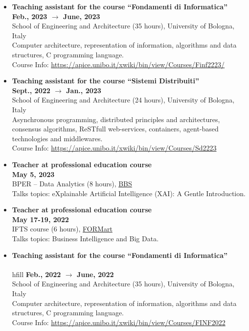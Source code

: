 \documentclass[11pt]{article}
\begin{document}
\begin{itemize}
	\item \textbf{ Teaching assistant for the course ``Fondamenti di Informatica'' }
	\\\hfill \textbf{Feb., 2023 $\rightarrow$ June, 2023}
	\\School of Engineering and Architecture (35 hours), University of Bologna, Italy
	\\Computer architecture, representation of information, algorithms and data structures, C programming language.
	\\Course Info: \url{https://apice.unibo.it/xwiki/bin/view/Courses/Finf2223/}
	\item \textbf{ Teaching assistant for the course ``Sistemi Distribuiti'' }
	\\\hfill \textbf{Sept., 2022 $\rightarrow$ Jan., 2023}
	\\School of Engineering and Architecture (24 hours), University of Bologna, Italy
	\\Asynchronous programming, distributed principles and architectures, consensus algorithms, ReSTfull web-services, containers, agent-based technologies and middlewares.
	\\Course Info: \url{https://apice.unibo.it/xwiki/bin/view/Courses/Sd2223}
	\item \textbf{ Teacher at professional education course }
	\\\hfill \textbf{May 5, 2023}
	\\BPER -- Data Analytics (8 hours), \href{https://www.bbs.unibo.eu/}{BBS}
	\\Talks topics: eXplainable Artificial Intelligence (XAI): A Gentle Introduction.
	\item \textbf{ Teacher at professional education course }
	\\\hfill \textbf{May 17-19, 2022}
	\\IFTS course (6 hours), \href{http://www.formart.it/home}{FORMart}
	\\Talks topics: Business Intelligence and Big Data.
	\item \textbf{ Teaching assistant for the course ``Fondamenti di Informatica'' }
	\\\\hfill \textbf{Feb., 2022 $\rightarrow$ June, 2022}
	\\School of Engineering and Architecture (35 hours), University of Bologna, Italy
	\\Computer architecture, representation of information, algorithms and data structures, C programming language.
	\\Course Info: \url{https://apice.unibo.it/xwiki/bin/view/Courses/FINF2022}
\end{itemize}
\end{document}
